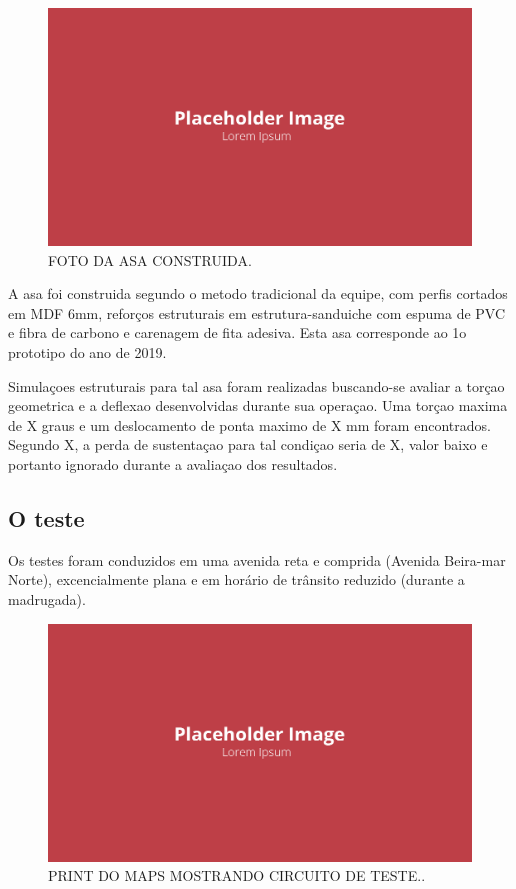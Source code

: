 \begin{figure}[!ht]
    \centering
    \includegraphics[width=.8\linewidth]{figuras/placeholder.png}
    \caption{FOTO DA ASA CONSTRUIDA\cite{autor}.}
    \label{fig:placeholder}
\end{figure}

A asa foi construida segundo o metodo tradicional da equipe, com perfis cortados em MDF 6mm, reforços estruturais em estrutura-sanduiche com espuma de PVC e fibra de carbono e carenagem de fita adesiva. Esta asa corresponde ao 1o prototipo do ano de 2019.

Simulaçoes estruturais para tal asa foram realizadas buscando-se avaliar a torçao geometrica e a deflexao desenvolvidas durante sua operaçao. Uma torçao maxima de X graus e um deslocamento de ponta maximo de X mm foram encontrados. Segundo X, a perda de sustentaçao para tal condiçao seria de X, valor baixo e portanto ignorado durante a avaliaçao dos resultados. 

\subsection{O teste}

Os testes foram conduzidos em uma avenida reta e comprida (Avenida Beira-mar Norte), excencialmente plana e em horário de trânsito reduzido (durante a madrugada).

\begin{figure}[!ht]
    \centering
    \includegraphics[width=.8\linewidth]{figuras/placeholder.png}
    \caption{PRINT DO MAPS MOSTRANDO CIRCUITO DE TESTE.\cite{autor}.}
    \label{fig:placeholder}
\end{figure}

